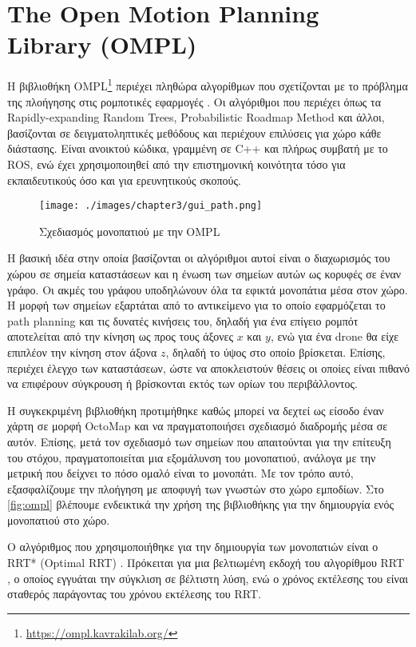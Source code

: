 \section{The Open Motion Planning Library (OMPL)}
\label{section:ompl}

Η βιβλιοθήκη OMPL\footnote{\href{https://ompl.kavrakilab.org/}{https://ompl.kavrakilab.org/}} περιέχει πληθώρα αλγορίθμων που σχετίζονται με το πρόβλημα της πλοήγησης στις ρομποτικές εφαρμογές \cite{6377468}. Οι αλγόριθμοι που περιέχει όπως τα Rapidly-expanding Random Trees, Probabilistic Roadmap Method και άλλοι, βασίζονται σε δειγματοληπτικές μεθόδους και περιέχουν επιλύσεις για χώρο κάθε διάστασης. Είναι ανοικτού κώδικα, γραμμένη σε C++ και πλήρως συμβατή με το ROS, ενώ έχει χρησιμοποιηθεί από την επιστημονική κοινότητα τόσο για εκπαιδευτικούς όσο και για ερευνητικούς σκοπούς.

\begin{figure}[!ht]
    \centering
    \texttt{[image: ./images/chapter3/gui\_path.png]}
    \caption{Σχεδιασμός μονοπατιού με την OMPL} 
    \label{fig:ompl}
\end{figure}

Η βασική ιδέα στην οποία βασίζονται οι αλγόριθμοι αυτοί είναι ο διαχωρισμός του χώρου σε σημεία καταστάσεων και η ένωση των σημείων αυτών ως κορυφές σε έναν γράφο. Οι ακμές του γράφου υποδηλώνουν όλα τα εφικτά μονοπάτια μέσα στον χώρο. Η μορφή των σημείων εξαρτάται από το αντικείμενο για το οποίο εφαρμόζεται το path planning και τις δυνατές κινήσεις του, δηλαδή για ένα επίγειο ρομπότ αποτελείται από την κίνηση ως προς τους άξονες $x$ και $y$, ενώ για ένα drone θα είχε επιπλέον την κίνηση στον άξονα $z$, δηλαδή το ύψος στο οποίο βρίσκεται. Επίσης, περιέχει έλεγχο των καταστάσεων, ώστε να αποκλειστούν θέσεις οι οποίες είναι πιθανό να επιφέρουν σύγκρουση ή βρίσκονται εκτός των ορίων του περιβάλλοντος.

Η συγκεκριμένη βιβλιοθήκη προτιμήθηκε καθώς μπορεί να δεχτεί ως είσοδο έναν χάρτη σε μορφή OctoMap και να πραγματοποιήσει σχεδιασμό διαδρομής μέσα σε αυτόν. Επίσης, μετά τον σχεδιασμό των σημείων που απαιτούνται για την επίτευξη του στόχου, πραγματοποιείται μια εξομάλυνση του μονοπατιού, ανάλογα με την μετρική που δείχνει το πόσο ομαλό είναι το μονοπάτι. Με τον τρόπο αυτό, εξασφαλίζουμε την πλοήγηση με αποφυγή των γνωστών στο χώρο εμποδίων. Στο \autoref{fig:ompl} βλέπουμε ενδεικτικά την χρήση της βιβλιοθήκης για την δημιουργία ενός μονοπατιού στο χώρο.

Ο αλγόριθμος που χρησιμοποιήθηκε για την δημιουργία των μονοπατιών είναι ο RRT* (Optimal RRT) \cite{DBLP:journals/corr/abs-1105-1186}. Πρόκειται για μια βελτιωμένη εκδοχή του αλγορίθμου RRT \cite{lavalle1999}, ο οποίος εγγυάται την σύγκλιση σε βέλτιστη λύση, ενώ ο χρόνος εκτέλεσης του είναι σταθερός παράγοντας του χρόνου εκτέλεσης του RRT. 
